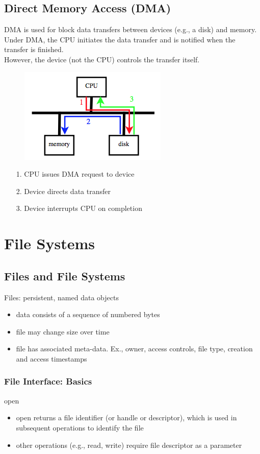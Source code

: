 \documentclass[12pt]{article}
\theoremstyle{plain}
\theoremstyle{definition}
\begin{document}
\subsection{Direct Memory Access (DMA)}
DMA is used for block data transfers between devices (e.g., a disk) and memory. \\

Under DMA, the CPU initiates the data transfer and is notified when the transfer is finished. \\
However, the device (not the CPU) controls the transfer itself.
\begin{figure}[H]
  \centering
  \includegraphics[scale=0.7]{pictures/dma.png}
\end{figure}
\begin{itemize}
  \item[1.] CPU issues DMA request to device
  \item[2.] Device directs data transfer
  \item[3.] Device interrupts CPU on completion
\end{itemize}


\newpage
\section{File Systems}
\subsection{Files and File Systems}
Files: persistent, named data objects
\begin{itemize}
  \item data consists of a sequence of numbered bytes
  \item file may change size over time
  \item file has associated meta-data. Ex., owner, access controls, file type, creation and access timestamps
\end{itemize}

\subsubsection{File Interface: Basics}
open
\begin{itemize}
  \item open returns a file identifier (or handle or descriptor), which is used in subsequent operations to identify the file
  \item other operations (e.g., read, write) require file descriptor as a parameter
\end{itemize}
\end{document}
